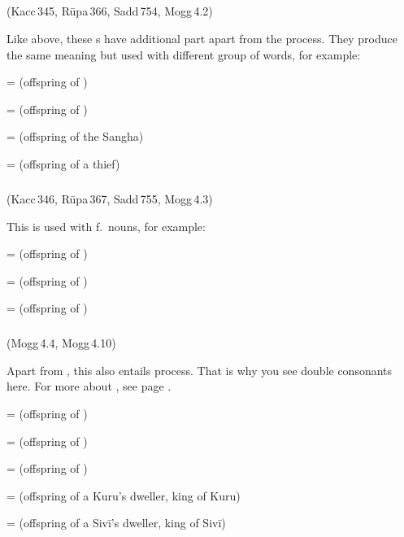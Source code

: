 \subparagraph*{} (Kacc\,345, R\=upa\,366, Sadd\,754, Mogg\,4.2)\label{pacct1:dnaayana}\label{pacct1:dnaana}

Like  above, these s have additional part apart from the  process. They produce the same meaning but used with different group of words, for example:

 =  (offspring of ) \par
{} =  (offspring of ) \par
{} =  (offspring of the Sangha) \par
{} =  (offspring of a thief) \par

\subparagraph*{} (Kacc\,346, R\=upa\,367, Sadd\,755, Mogg\,4.3)\label{pacct1:dneyya}

This  is used with f.\ nouns, for example:

 =  (offspring of ) \par
{} =  (offspring of ) \par
{} =  (offspring of ) \par

\subparagraph*{} (Mogg\,4.4, Mogg\,4.10)\label{pacct1:dnaya}

Apart from , this  also entails  process. That is why you see double consonants here. For more about , see page \pageref{pacca:ya2}.

 =  (offspring of ) \par
{} =  (offspring of ) \par
{} =  (offspring of ) \par
{} =  (offspring of a Kuru's dweller, king of Kuru) \par
{} =  (offspring of a Siv\=i's dweller, king of Siv\=i) \par

